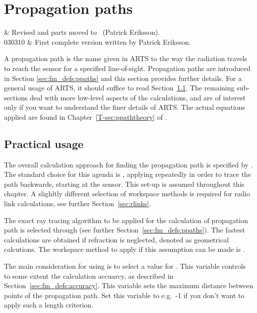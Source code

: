 \chapter{Propagation paths}
 \label{sec:ppath}


 & Revised and parts moved to \theory\ (Patrick Eriksson).\\
  030310 & First complete version written by Patrick Eriksson.\\
\stophistory


\graphicspath{{Figs/ppath/}}


A propagation path is the name given in ARTS to the way the radiation travels
to reach the sensor for a specified line-of-sight. Propagation paths are
introduced in Section \ref{sec:fm_defs:ppaths} and this section provides
further details. For a general usage of ARTS, it should suffice to read
Section~\ref{sec:ppath:usage}. The remaining sub-sections deal with more
low-level aspects of the calculations, and are of interest only if you want to
understand the finer details of ARTS. The actual equations applied are found in
Chapter~\ref{T-sec:ppaththeory} of \theory.


\section{Practical usage}
\label{sec:ppath:usage}

The overall calculation approach for finding the propagation path is specified
by . The standard choice for this agenda is
, applying 
repeatedly in order to trace the path backwards, starting at the sensor. This
set-up is assumed throughout this chapter. A slighltly different selection of
workspace methods is required for radio link calculations, see further
Section~\ref{sec:rlinks}.

The exact ray tracing algorithm to be applied for the calculation of
propagation path is selected through 
(see further Section~\ref{sec:fm_defs:ppaths}). The fastest calculations are
obtained if refraction is neglected, denoted as geometrical calcutions. The
workspace method to apply if this assumption can be made is
.

The main consideration for using  is to select
a value for . This variable controls to some extent the
calculation accuarcy, as described in Section~\ref{sec:fm_defs:accuracy}. This
variable sets the maximum distance between points of the propagation
path. Set this variable to e.g.\ -1 if you don't want to apply such a length
criterion.


